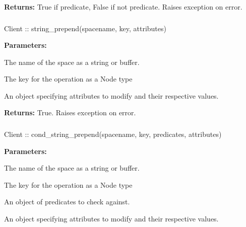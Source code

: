 \noindent\textbf{Returns:}
True if predicate, False if not predicate.  Raises exception on error.

\subsubsection{}
\label{api:nodejs:string_prepend}
\begin{javascriptcode}
Client :: string_prepend(spacename, key, attributes)
\end{javascriptcode}
\funcdesc 

\noindent\textbf{Parameters:}
\begin{description}[labelindent=\widthof{{\code{attributes}}},leftmargin=*,noitemsep,nolistsep,align=right]
\item[\code{spacename}] The name of the space as a string or buffer.
\item[\code{key}] The key for the operation as a Node type
\item[\code{attributes}] An object specifying attributes to modify and their respective values.
\end{description}

\noindent\textbf{Returns:}
True.  Raises exception on error.

\subsubsection{}
\label{api:nodejs:cond_string_prepend}
\begin{javascriptcode}
Client :: cond_string_prepend(spacename, key, predicates, attributes)
\end{javascriptcode}
\funcdesc 

\noindent\textbf{Parameters:}
\begin{description}[labelindent=\widthof{{\code{predicates}}},leftmargin=*,noitemsep,nolistsep,align=right]
\item[\code{spacename}] The name of the space as a string or buffer.
\item[\code{key}] The key for the operation as a Node type
\item[\code{predicates}] An object of predicates to check against.
\item[\code{attributes}] An object specifying attributes to modify and their respective values.
\end{description}

